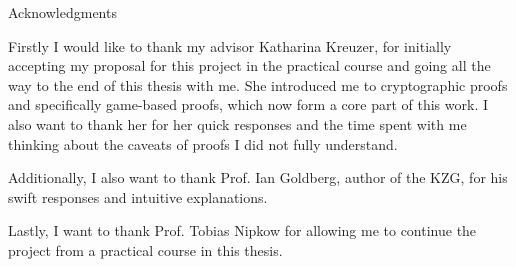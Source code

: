\thispagestyle{empty}

\vspace*{20mm}

\begin{center}
    { Acknowledgments}
\end{center}

\vspace{10mm}

Firstly I would like to thank my advisor Katharina Kreuzer, for initially accepting my proposal for this project in the practical course and going all the way to the end of this thesis with me. She introduced me to cryptographic proofs and specifically game-based proofs, which now form a core part of this work.
I also want to thank her for her quick responses and the time spent with me thinking about the caveats of proofs I did not fully understand. 

Additionally, I also want to thank Prof. Ian Goldberg, author of the KZG, for his swift responses and intuitive explanations. 

Lastly, I want to thank Prof. Tobias Nipkow for allowing me to continue the project from a practical course in this thesis.


\cleardoublepage{}
